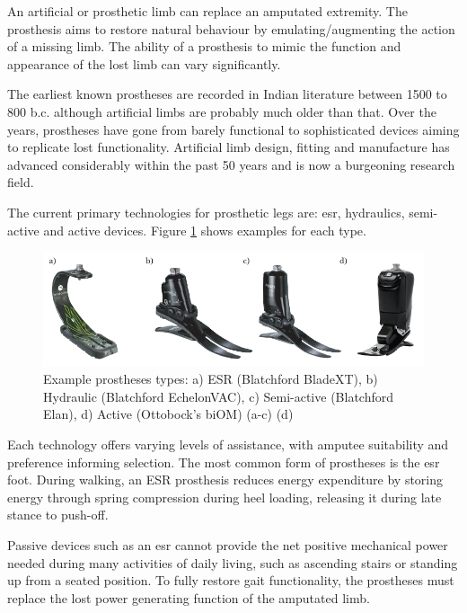 An artificial or prosthetic limb can replace an amputated extremity. The prosthesis aims to restore natural behaviour by emulating/augmenting the action of a missing limb.\cite{Tucker2015} The ability of a prosthesis to mimic the function and appearance of the lost limb can vary significantly.

The earliest known prostheses are recorded in Indian literature between 1500 to 800 b.c. although artificial limbs are probably much older than that\cite{Breakey1976}. Over the years, prostheses have gone from barely functional to sophisticated devices aiming to replicate lost functionality. Artificial limb design, fitting and manufacture has advanced considerably within the past 50 years and is now a burgeoning research field.\cite{Kirkup2007}

The current primary technologies for prosthetic legs are: \acrfull{esr}, hydraulics, semi-active and active devices\cite{Asif2021}. Figure \ref{Fig:CH2-prostheses_type} shows examples for each type.

\begin{figure}[!hbt]
    \centering
    \includegraphics[width=\textwidth]{content/2-Background/ch2_prosthetic_device_types.pdf}
    \caption[Example prostheses types]{Example prostheses types: a) ESR (Blatchford BladeXT), b) Hydraulic (Blatchford EchelonVAC), c) Semi-active (Blatchford Elan), d) Active (Ottobock's biOM) (a-c)\cite{blatchford2018} (d)\cite{biom2018} }
    \label{Fig:CH2-prostheses_type}
\end{figure}

Each technology offers varying levels of assistance, with amputee suitability and preference informing selection. The most common form of prostheses is the \acrshort{esr} foot. During walking, an ESR prosthesis reduces energy expenditure by storing energy through spring compression during heel loading, releasing it during late stance to push-off.\cite{Asif2021}

Passive devices such as an \acrshort{esr} cannot provide the net positive mechanical power needed during many activities of daily living, such as ascending stairs or standing up from a seated position\cite{Simon2013}. To fully restore gait functionality, the prostheses must replace the lost power generating function of the amputated limb.

